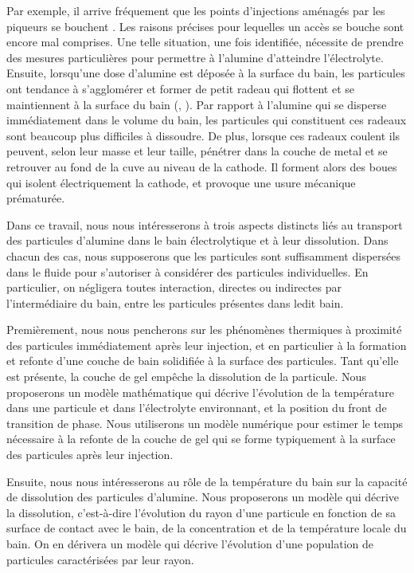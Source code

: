 Par exemple, il arrive fréquement que les points d'injections
aménagés par les piqueurs se bouchent \cite{Dion2017}. Les raisons
précises pour lequelles un accès se bouche sont encore mal
comprises. Une telle situation, une fois identifiée, nécessite de
prendre des mesures particulières pour permettre à l'alumine
d'atteindre l'électrolyte. Ensuite, lorsqu'une dose d'alumine est
déposée à la surface du bain, les particules ont tendance à
s'agglomérer et former de petit radeau qui flottent et se maintiennent
à la surface du bain (\cite{Dassylva2015}, \cite{Kaszas2017}). Par
rapport à l'alumine qui se disperse immédiatement dans le volume
du bain, les particules qui constituent ces radeaux sont beaucoup plus
difficiles à dissoudre. De plus, lorsque ces radeaux coulent ils
peuvent, selon leur masse et leur taille, pénétrer dans la couche
de metal et se retrouver au fond de la cuve au niveau de la
cathode. Il forment alors des boues qui isolent électriquement la
cathode, et provoque une usure mécanique prématurée.

Dans ce travail, nous nous intéresserons à trois aspects distincts
liés au transport des particules d'alumine dans le bain électrolytique
et à leur dissolution. Dans chacun des cas, nous supposerons que les
particules sont suffisamment dispersées dans le fluide pour
s'autoriser à considérer des particules individuelles. En particulier,
on négligera toutes interaction, directes ou indirectes par
l'intermédiaire du bain, entre les particules présentes dans ledit bain.

Premièrement, nous nous pencherons sur les phénomènes thermiques à
proximité des particules immédiatement après leur injection, et en
particulier à la formation et refonte d'une couche de bain solidifiée
à la surface des particules. Tant qu'elle est présente, la couche de
gel empêche la dissolution de la particule. Nous proposerons un modèle
mathématique qui décrive l'évolution de la température dans une
particule et dans l'électrolyte environnant, et la position du front
de transition de phase. Nous utiliserons un modèle numérique pour
estimer le temps nécessaire à la refonte de la couche de gel qui se
forme typiquement à la surface des particules après leur injection.

Ensuite, nous nous intéresserons au rôle de la température du bain sur
la capacité de dissolution des particules d'alumine. Nous proposerons
un modèle qui décrive la dissolution, c'est-à-dire l'évolution du
rayon d'une particule en fonction de sa surface de contact avec le
bain, de la concentration et de la température locale du bain. On en
dérivera un modèle qui décrive l'évolution d'une population de
particules caractérisées par leur rayon.

